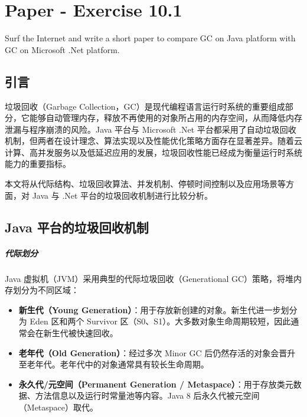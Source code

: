 \chapter{Paper - Exercise 10.1}


Surf the Internet and write a short paper to compare GC on Java platform with GC on Microsoft .Net platform.
\section{引言}

垃圾回收（Garbage Collection，GC）是现代编程语言运行时系统的重要组成部分，它能够自动管理内存，释放不再使用的对象所占用的内存空间，从而降低内存泄漏与程序崩溃的风险。Java 平台与 Microsoft .Net 平台都采用了自动垃圾回收机制，但两者在设计理念、算法实现以及性能优化策略方面存在显著差异。随着云计算、高并发服务以及低延迟应用的发展，垃圾回收性能已经成为衡量运行时系统能力的重要指标。

本文将从代际结构、垃圾回收算法、并发机制、停顿时间控制以及应用场景等方面，对 Java 与 .Net 平台的垃圾回收机制进行比较分析。

\section{Java 平台的垃圾回收机制}

\paragraph{代际划分}

Java 虚拟机（JVM）采用典型的代际垃圾回收（Generational GC）策略，将堆内存划分为不同区域：

\begin{itemize}
    \item \textbf{新生代（Young Generation）}：用于存放新创建的对象。新生代进一步划分为 Eden 区和两个 Survivor 区（S0、S1）。大多数对象生命周期较短，因此通常会在新生代被快速回收。
    
    \item \textbf{老年代（Old Generation）}：经过多次 Minor GC 后仍然存活的对象会晋升至老年代。老年代中的对象通常具有较长生命周期。
    
    \item \textbf{永久代/元空间（Permanent Generation / Metaspace）}：用于存放类元数据、方法信息以及运行时常量池等内容。Java 8 后永久代被元空间（Metaspace）取代。
\end{itemize}

